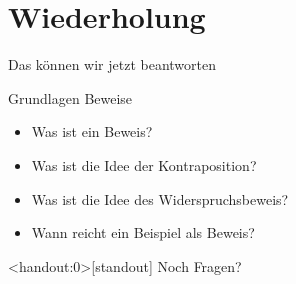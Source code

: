 




\section{Wiederholung}
\begin{frame}[fragile]{Das können wir jetzt beantworten}
    \begin{alertblock}{Grundlagen Beweise}
    \begin{itemize}
        \item Was ist ein Beweis?
        \item Was ist die Idee der Kontraposition?
        \item Was ist die Idee des Widerspruchsbeweis?
        \item Wann reicht ein Beispiel als Beweis?
    \end{itemize}
    \end{alertblock}
\end{frame}

\begin{frame}<handout:0>[standout]
  Noch Fragen?
\end{frame}


